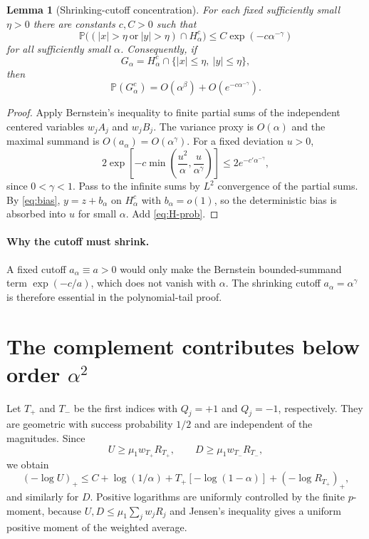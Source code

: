 \documentclass[11pt,a4paper]{article}
\newtheorem{lemma}{Lemma}
\newcommand{\Prob}{\mathbb P}
\begin{document}
\begin{lemma}[Shrinking-cutoff concentration]
For each fixed sufficiently small $\eta>0$ there are constants $c,C>0$ such that
\begin{equation}\label{eq:local-prob}
\Prob\bigl((|x|>\eta\ \text{or}\ |y|>\eta)\cap H_\alpha^c\bigr)
\le C\exp(-c\alpha^{-\gamma})
\end{equation}
for all sufficiently small $\alpha$.  Consequently, if
\[
G_\alpha=H_\alpha^c\cap\{|x|\le\eta,\ |y|\le\eta\},
\]
then
\begin{equation}\label{eq:Gcomp}
\Prob(G_\alpha^c)=O(\alpha^\beta)+O(e^{-c\alpha^{-\gamma}}).
\end{equation}
\end{lemma}

\begin{proof}
Apply Bernstein's inequality to finite partial sums of the independent centered variables $w_jA_j$ and $w_jB_j$.  The variance proxy is $O(\alpha)$ and the maximal summand is $O(a_\alpha)=O(\alpha^\gamma)$.  For a fixed deviation $u>0$,
\[
2\exp\left[-c\min\left(\frac{u^2}{\alpha},\frac{u}{\alpha^\gamma}\right)\right]
\le 2e^{-c'\alpha^{-\gamma}},
\]
since $0<\gamma<1$.  Pass to the infinite sums by $L^2$ convergence of the partial sums.  By \eqref{eq:bias}, $y=z+b_\alpha$ on $H_\alpha^c$ with $b_\alpha=o(1)$, so the deterministic bias is absorbed into $u$ for small $\alpha$.  Add \eqref{eq:H-prob}.
\end{proof}

\paragraph{Why the cutoff must shrink.}
A fixed cutoff $a_\alpha\equiv a>0$ would only make the Bernstein bounded-summand term $\exp(-c/a)$, which does not vanish with $\alpha$.  The shrinking cutoff $a_\alpha=\alpha^\gamma$ is therefore essential in the polynomial-tail proof.

\section{The complement contributes below order
  \texorpdfstring{$\alpha^2$}{alpha squared}}
Let $T_+$ and $T_-$ be the first indices with $Q_j=+1$ and $Q_j=-1$, respectively.  They are geometric with success probability $1/2$ and are independent of the magnitudes.  Since
\[
U\ge \mu_1w_{T_+}R_{T_+},\qquad D\ge \mu_1w_{T_-}R_{T_-},
\]
we obtain
\[
(-\log U)_+
\le C+\log(1/\alpha)+T_+[-\log(1-\alpha)]+(-\log R_{T_+})_+,
\]
and similarly for $D$.  Positive logarithms are uniformly controlled by the finite $p$-moment, because $U,D\le \mu_1\sum_jw_jR_j$ and Jensen's inequality gives a uniform positive moment of the weighted average.
\end{document}
